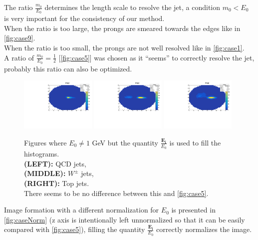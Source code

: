 

	
    The ratio $\frac{m_0}{E_0}$ determines the length scale to resolve the jet,
    a condition $m_{0}<E_{0}$ is very important for the consistency of our method.\\
    When the ratio is too large, the prongs are smeared towards the edges like in \autoref{fig:case9}.\\
    When the ratio is too small, the prongs are not well resolved like in \autoref{fig:case1}.\\
    A ratio of $\frac{m_0}{E_0}=\frac{1}{2}$ [\autoref{fig:case5}] was chosen as it ``seems'' to correctly resolve the jet, probably this ratio can also be optimized.
    
    \begin{figure}
        \begin{center}
            \includegraphics[width=0.32\textwidth]{./NoNorm/imageQCD.pdf}
            \includegraphics[width=0.32\textwidth]{./NoNorm/imageW.pdf}
            \includegraphics[width=0.32\textwidth]{./NoNorm/imageTOP.pdf}
        \end{center}
        \caption{
            Figures where $E_0 \ne 1$ GeV but the quantity $\frac{\mathbf{E_i}}{E_0}$ is used to fill the histograms.\\
            {\bf(LEFT):} QCD jets,\\
            {\bf(MIDDLE):} $W^{\pm}$ jets,\\
            {\bf(RIGHT):} Top jets.\\
            There seems to be no difference between this and \autoref{fig:case5}.
        }
        \label{fig:caseNorm}
    \end{figure}

    Image formation with a different normalization for $E_0$ is presented in \autoref{fig:caseNorm} (z axis is intentionally left unnormalized so that it can be easily compared with \autoref{fig:case5}), filling the quantity $\frac{\mathbf{E_i}}{E_0}$ correctly normalizes the image.
    
    
    


